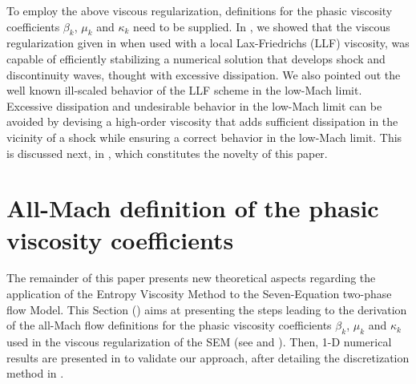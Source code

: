 \documentclass[preprint,10pt]{elsarticle}
\begin{document}
To employ the above viscous regularization, definitions for the phasic viscosity coefficients $\beta_k$, $\mu_k$ and $\kappa_k$ need to be supplied. 
In \cite{Marco_paper_sem}, we showed that the viscous regularization given in  when used with a local Lax-Friedrichs (LLF) 
viscosity, was capable of efficiently stabilizing a numerical solution that develops shock and discontinuity waves, thought with excessive dissipation. 
We also pointed out the well known ill-scaled behavior of the LLF scheme in the low-Mach limit. Excessive dissipation and undesirable behavior in the low-Mach limit can be avoided 
by devising a high-order viscosity that adds sufficient dissipation in the vicinity of a shock while ensuring a correct behavior in the low-Mach limit. 
This is discussed next, in , which constitutes the novelty of this paper.
%  
\section{All-Mach definition of the phasic viscosity coefficients}\label{sec:visc-def}
%
%
The remainder of this paper presents new theoretical aspects regarding the application of the Entropy Viscosity Method to the Seven-Equation two-phase flow Model.
This Section () aims at presenting the steps leading to the derivation of the all-Mach flow definitions for the phasic viscosity coefficients $\beta_k$, $\mu_k$ and $\kappa_k$ used in the viscous regularization of the SEM (see  and ). Then, 1-D numerical results are presented in  to validate our approach, after detailing the discretization method in . 
\end{document}
